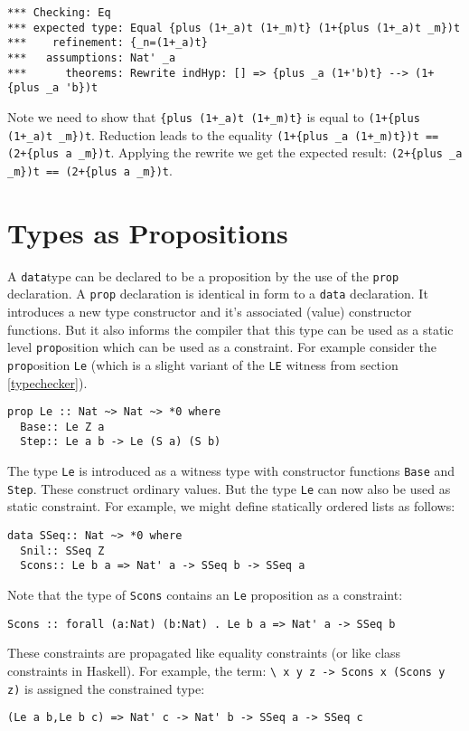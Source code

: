 \documentclass[11pt,twoside]{article}
\begin{document}
\begin{verbatim}
*** Checking: Eq
*** expected type: Equal {plus (1+_a)t (1+_m)t} (1+{plus (1+_a)t _m})t
***    refinement: {_n=(1+_a)t}
***   assumptions: Nat' _a
***      theorems: Rewrite indHyp: [] => {plus _a (1+'b)t} --> (1+{plus _a 'b})t
\end{verbatim}

Note we need to show that \verb|{plus (1+_a)t (1+_m)t}|
is equal to \verb|(1+{plus (1+_a)t _m})t|. Reduction leads to the equality
\verb|(1+{plus _a (1+_m)t})t == (2+{plus a _m})t|. Applying the rewrite
we get the expected result: \verb|(2+{plus _a _m})t == (2+{plus a _m})t|.

\section{Types as Propositions}

A {\tt data}type can be declared to be a proposition by the use
of the {\tt prop} declaration. A {\tt prop} declaration is
identical in form to a {\tt data} declaration. It introduces
a new type constructor and it's associated (value) constructor functions.
But it also informs the compiler that this type can be used as
a static level {\tt prop}osition which can be used as a constraint.
For example consider the {\tt prop}osition {\tt Le} (which is a slight
variant of the {\tt LE} witness from section \ref{typechecker}).
\begin{verbatim}
prop Le :: Nat ~> Nat ~> *0 where
  Base:: Le Z a
  Step:: Le a b -> Le (S a) (S b)
\end{verbatim}
The type {\tt Le} is introduced as a witness type with constructor
functions {\tt Base} and {\tt Step}. These construct ordinary values.
But the type {\tt Le} can now also be used as static constraint.
For example, we might define statically ordered lists as follows:

\begin{verbatim}
data SSeq:: Nat ~> *0 where
  Snil:: SSeq Z
  Scons:: Le b a => Nat' a -> SSeq b -> SSeq a
\end{verbatim}
Note that the type of {\tt Scons} contains an {\tt Le}
proposition as a constraint:

\begin{verbatim}
Scons :: forall (a:Nat) (b:Nat) . Le b a => Nat' a -> SSeq b
\end{verbatim}

These constraints are propagated like equality constraints
(or like class constraints in Haskell). For example, the
term: \verb+\ x y z -> Scons x (Scons y z)+ is assigned the
constrained type:
\begin{verbatim}
(Le a b,Le b c) => Nat' c -> Nat' b -> SSeq a -> SSeq c
\end{verbatim}
\end{document}
